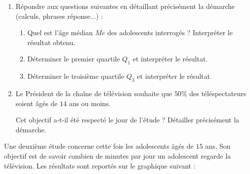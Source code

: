 \documentclass[10pt,french]{article}
\newcommand\x{\times}
\begin{document}
\begin{enumerate}[resume]
    \item Répondre aux questions suivantes en détaillant précisément la démarche (calculs, phrases réponse...) :
        \begin{enumerate}
            \item Quel est l'âge médian $Me$ des adolescents interrogés ? Interpréter le résultat obtenu.
            \item Déterminer le premier quartile $Q_1$ et interpréter le résultat.
            \item Déterminer le troisième quartile $Q_3$ et interpréter le résultat.
        \end{enumerate}
    \item Le Président de la chaîne de télévision souhaite que $50\%$ des téléspectateurs soient âgés de $14$ ans ou moins.\par Cet objectif a-t-il été respecté le jour de l'étude ? Détailler précisément la démarche.
\end{enumerate}

Une deuxième étude concerne cette fois les adolescents âgés de $15$ ans. Son objectif est de savoir combien de minutes par jour un adolescent regarde la télévision. Les résultats sont reportés sur le graphique suivant :

\begin{center}
\end{center}
\end{document}
